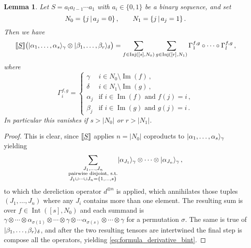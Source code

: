 \documentclass[english,letter paper,12pt,reqno]{article}
\DeclarePairedDelimiter\ket{\lvert}{\rangle}
\newtheorem{lemma}[theorem]{Lemma}
\theoremstyle{example}
\def\be{\begin{equation}}
\def\ee{\end{equation}}
\begin{document}
\begin{lemma}\label{lemma:derivative_bint} Let $S = a_l a_{l-1} \cdots a_1$ with $a_i \in \{0,1\}$ be a binary sequence, and set
\[
N_0 = \{ j \,|\, a_j = 0 \}\,, \qquad N_1 = \{ j \,|\, a_j = 1 \}\,.
\]
Then we have
\be\label{eq:formula_derivative_bint}
\den{ \underline{S} }\big( \ket{\alpha_1,\ldots,\alpha_s}_{\gamma} \otimes \ket{\beta_1,\ldots,\beta_r}_{\delta} \big) = \sum_{f \in \operatorname{Inj}([s],N_0)} \sum_{g \in \operatorname{Inj}([r],N_1)} \Gamma^{f,g}_1 \circ \cdots \circ \Gamma^{f,g}_l\,,
\ee
where
\[
\Gamma^{f,g}_i = \begin{cases}
\gamma & i \in N_0 \setminus \operatorname{Im}(f)\,,\\
\delta & i \in N_1 \setminus \operatorname{Im}(g)\,,\\
\alpha_j & \text{if } i \in \operatorname{Im}(f) \text{ and } f(j) = i\,,\\
\beta_j & \text{if } i \in \operatorname{Im}(g) \text{ and } g(j) = i\,.
\end{cases}
\]
In particular this vanishes if $s > |N_0|$ or $r > |N_1|$.
\end{lemma}
\begin{proof}
This is clear, since $\llbracket \underline{S} \rrbracket$ applies $n = |N_0|$ coproducts to $\ket{\alpha_1,\ldots,\alpha_s}_{\gamma}$ yielding
\[
\sum_{\substack{J_1,\ldots,J_n\\ \text{pairwise disjoint, s.t.} \\ J_1 \cup \cdots \cup J_n = \{1,\ldots,s\}}} \ket{\alpha_{J_1}}_\gamma \otimes \cdots \otimes \ket{\alpha_{J_n}}_\gamma\,,
\]
to which the dereliction operator $d^{\otimes n}$ is applied, which annihilates those tuples $(J_1,\ldots,J_n)$ where any $J_i$ contains more than one element. The resulting sum is over $f \in \operatorname{Int}([s],N_0)$ and each summand is $\gamma \otimes \cdots \otimes \alpha_{\sigma(1)} \otimes \cdots \otimes \gamma \otimes \cdots \alpha_{\sigma(s)} \otimes \cdots \otimes \gamma$ for a permutation $\sigma$. The same is true of $\ket{\beta_1,\ldots,\beta_r}_{\delta}$, and after the two resulting tensors are intertwined the final step is compose all the operators, yielding \eqref{eq:formula_derivative_bint}.
\end{proof}
\end{document}
